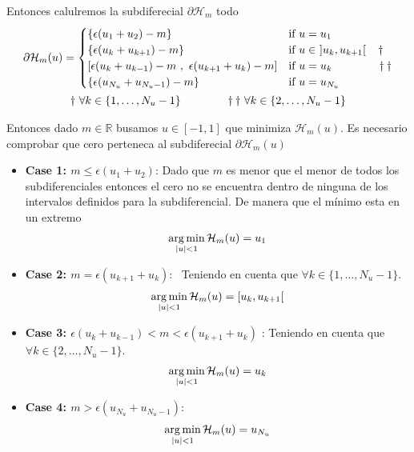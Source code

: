 Entonces calulremos la subdiferecial $\partial \mathcal{H}_m$ todo 
\begin{gather}
    \partial \mathcal{H}_m(u) = \begin{cases}
         \{\epsilon(u_1 + u_2) - m \}   & \text{if} \ u = u_1 \\
         \{\epsilon(u_k + u_{k+1})-m\}  & \text{if} \ u \in \ ]u_k,u_{k+1}[ \hspace{1.1em} \dagger\\
         [\epsilon(u_k+u_{k-1})-m \ , \ \epsilon(u_{k+1}+u_k)-m] & \text{if} \ u = u_k \hspace{4.em} \dagger \dagger \\
         \{\epsilon(u_{N_u} + u_{N_u-1}) - m \} & \text{if} \ u = u_{N_u} 
    \end{cases} \\
    \notag \dagger \ \forall k \in \{1,\dots,N_u-1\} \hspace{4em}
    \dagger \dagger \ \forall k \in \{2,\dots,N_u-1\}
\end{gather} 

Entonces dado $m\in \mathbb{R}$ busamos $u \in [-1,1]$ que minimiza $\mathcal{H}_m(u)$. Es necesario comprobar que cero perteneca al subdiferecial $\partial \mathcal{H}_m(u)$

\begin{itemize}
    \item \textbf{Case 1: $m \leq \epsilon(u_1+u_2)$}: Dado que $m$ es menor que el menor de todos los subdiferenciales entonces el cero no se encuentra dentro de ninguna de los intervalos definidos para la subdiferencial. De manera que el mínimo esta en un extremo
    \begin{gather}
        \operatorname*{arg\,min}_{|u| < 1} \mathcal{H}_m(u) = u_1
    \end{gather} 
    \item \textbf{Case 2: $m = \epsilon(u_{k+1}+u_k) $}:  Teniendo en cuenta que $\forall k \in \{1,\dots,N_u-1\}$.
    \begin{gather}
        \operatorname*{arg\,min}_{|u| < 1} \mathcal{H}_m(u) = [u_k,u_{k+1}[ 
    \end{gather} 
    \item \textbf{Case 3: $\epsilon(u_k+u_{k-1})<m<\epsilon(u_{k+1}+u_k)$} : Teniendo en cuenta que $\forall k \in \{2,\dots,N_u-1\}$.
    \begin{gather}
        \operatorname*{arg\,min}_{|u| < 1} \mathcal{H}_m(u) = u_k
    \end{gather}
    \item \textbf{Case 4: $m>\epsilon(u_{N_u}+u_{N_u-1})$}:
    \begin{gather}
        \operatorname*{arg\,min}_{|u| < 1} \mathcal{H}_m(u) = u_{N_u}
    \end{gather} 
\end{itemize}


